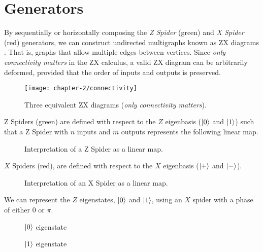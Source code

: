 \section{Generators}

By sequentially or horizontally composing the \textit{Z Spider} (green) and \textit{X Spider} (red) generators, we can construct undirected multigraphs known as ZX diagrams \cite{Wetering2020}. That is, graphs that allow multiple edges between vertices. Since \textit{only connectivity matters} in the ZX calculus, a valid ZX diagram can be arbitrarily deformed, provided that the order of inputs and outputs is preserved.

\begin{figure}[H]
\centering
    \centering
    \texttt{[image: chapter-2/connectivity]}
    \caption{Three equivalent ZX diagrams (\textit{only connectivity matters}).}
    \label{only-connectivity-matters}
\end{figure}

Z Spiders (green) are defined with respect to the $Z$ eigenbasis ($\ket 0$ and $\ket 1$) such that a Z Spider with $n$ inputs and $m$ outputs represents the following linear map.

\begin{figure}[H]
\centering
{}
\caption{Interpretation of a Z Spider as a linear map.}
\end{figure}

$X$ Spiders (red), are defined with respect to the $X$ eigenbasis ($\ket +$ and $\ket -$).

\begin{figure}[H]
\centering
{}
\caption{Interpretation of an X Spider as a linear map.}
\end{figure}

We can represent the $Z$ eigenstates, $\ket 0$ and $\ket 1$, using an $X$ spider with a phase of either $0$ or $\pi$.

\begin{figure}[H]
\centering
\begin{minipage}{.4\textwidth}
    \centering
    \caption{$\ket 0$ eigenstate}
\end{minipage}%
\begin{minipage}{.4\textwidth}
    \centering
    \caption{$\ket 1$ eigenstate}
\end{minipage}
\end{figure}


